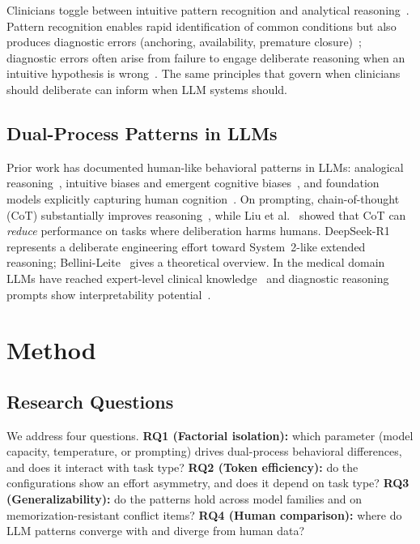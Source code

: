 \documentclass[conference]{IEEEtran}
\begin{document}
Clinicians toggle between intuitive pattern recognition and analytical reasoning~\cite{Croskerry2009}. Pattern recognition enables rapid identification of common conditions but also produces diagnostic errors (anchoring, availability, premature closure)~\cite{Croskerry2013, Saposnik2016}; diagnostic errors often arise from failure to engage deliberate reasoning when an intuitive hypothesis is wrong~\cite{Norman2009, Pelaccia2011}. The same principles that govern when clinicians should deliberate can inform when LLM systems should.

\subsection{Dual-Process Patterns in LLMs}

Prior work has documented human-like behavioral patterns in LLMs: analogical reasoning~\cite{Webb2023}, intuitive biases and emergent cognitive biases~\cite{Binz2023, Hagendorff2023, Itzhak2024}, and foundation models explicitly capturing human cognition~\cite{Binz2025}. On prompting, chain-of-thought (CoT) substantially improves reasoning~\cite{Wei2022, Kojima2022}, while Liu et al.~\cite{Liu2024} showed that CoT can \textit{reduce} performance on tasks where deliberation harms humans. DeepSeek-R1~\cite{DeepSeekAI2025} represents a deliberate engineering effort toward System~2-like extended reasoning; Bellini-Leite~\cite{BelliniLeite2024} gives a theoretical overview. In the medical domain LLMs have reached expert-level clinical knowledge~\cite{Singhal2023, Nori2023} and diagnostic reasoning prompts show interpretability potential~\cite{Savage2024}.

\section{Method}
\label{sec:method}

\subsection{Research Questions}

We address four questions. \textbf{RQ1 (Factorial isolation):} which parameter (model capacity, temperature, or prompting) drives dual-process behavioral differences, and does it interact with task type? \textbf{RQ2 (Token efficiency):} do the configurations show an effort asymmetry, and does it depend on task type? \textbf{RQ3 (Generalizability):} do the patterns hold across model families and on memorization-resistant conflict items? \textbf{RQ4 (Human comparison):} where do LLM patterns converge with and diverge from human data?
\end{document}
